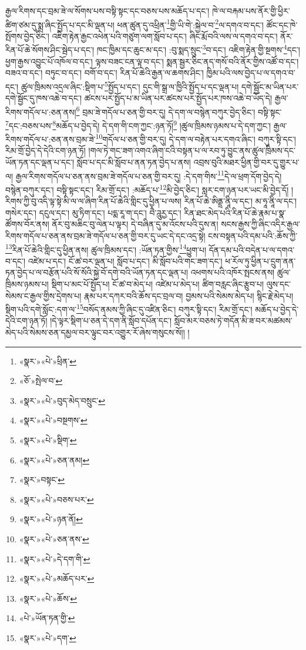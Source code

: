 རྒྱལ་རིགས་དང་བྲམ་ཟེ་ལ་སོགས་པས་བསྟི་སྟང་དང་བཅས་པས་མཆོད་པ་དང་། ཁེ་ལ་བརྐམ་པས་ནོར་གྱི་ཕྱིར་ཚིག་ཙམ་དུ་སྨྲ་ཞིང་སྤྱོད་པ་དང་མི་ལྡན་པ། ཕན་ཚུན་དུ་འཕྲིན་\footnote{«སྣར་»«པེ་»ཕྲིན་}གྱི་ཡི་གེ་:སྐྱེལ་བ་\footnote{«ཅོ་»སྤེལ་བ་}ལ་དགའ་བ་དང་། ཚོང་དང་ཁེ་སྤོགས་བྱེད་ཅིང་། འཇིག་རྟེན་རྒྱང་འཕེན་པའི་གཙུག་ལག་སློབ་པ་དང་། ཞིང་རྨོ་བའི་ལས་ལ་དགའ་བ་དང་། ནོར་རིན་པོ་ཆེ་སོགས་ཤིང་སྦེད་པ་དང་། ཁང་ཁྱིམ་དང་ཆུང་མ་དང་། :བུ་སྨད་སྲུང་\footnote{«སྣར་»«པེ་»བུད་མེད་བསྲུང་}བ་དང་། འཇིག་རྟེན་གྱི་སྔགས་\footnote{«སྣར་»«པེ་»བསྔགས་}དང་། ཕྱག་རྒྱས་འབྱུང་པོ་འཁོལ་བ་དང་། ལྟས་བཟང་ངན་ལྟ་བ་དང་། སྨན་སྦྱར་ཅིང་ནད་གསོ་བའི་ནོར་གྱིས་འཚོ་བ་དང་། བཟའ་བ་དང་། བཏུང་བ་དང་། བགོ་བ་དང་། རིན་པོ་ཆེའི་རྒྱན་ལ་ཆགས་ཤིང་། ཁྱིམ་པའི་ལས་བྱེད་པ་ལ་དགའ་བ་དང་། ཚུལ་ཁྲིམས་འདྲལ་ཞིང་:སྡིག་པ་\footnote{«སྣར་»«པེ་»སྡིག་}སྤྱོད་པ་དང་། དུང་གི་སྒྲ་ལ་ཁྱིའི་སྤྱོད་པ་དང་ལྡན་པ། དགེ་སྦྱོང་མ་ཡིན་པར་དགེ་སྦྱོང་དུ་ཁས་འཆེ་བ་དང་། ཚངས་པར་སྤྱོད་པ་མ་ཡིན་པར་ཚངས་པར་སྤྱོད་པར་ཁས་འཆེ་བ་ཡོད་དེ། རྒྱལ་རིགས་གདོལ་པ་:ཅན་ནས།\footnote{«སྣར་»«པེ་»ཅན་ནམ།} བྲམ་ཟེ་གདོལ་པ་ཅན་གྱི་བར་དུ། དེ་དག་ལ་བསྙེན་བཀུར་བྱེད་ཅིང་། བསྟི་སྟང་\footnote{«སྣར་»བསྟང་}དང་:བཅས་པས་\footnote{«སྣར་»«པེ་»བཅས་པར་}མཆོད་པ་བྱེད་དེ། དེ་དག་གི་ངག་ཀྱང་:ཉན་ཏོ།\footnote{«སྣར་»«པེ་»ཉན་ནོ།} །ཚུལ་ཁྲིམས་ཉམས་པ་དེ་དག་ཀྱང་། རྒྱལ་རིགས་གདོལ་པ་:ཅན་ནས་བྲམ་ཟེ་\footnote{«སྣར་»«པེ་»ཅན་ནས་}གདོལ་པ་ཅན་གྱི་བར་དུ། དེ་དག་ལ་བརྟེན་པར་དགའ་ཞིང་། བཀུར་སྟི་དང་། རིམ་གྲོ་བྱེད་དེ་དེའི་ངག་ཉན་ཏོ། །གལ་ཏེ་གང་ཟག་འགའ་ཞིག་ངའི་བསྟན་པ་ལ་རབ་ཏུ་བྱུང་ནས་ཚུལ་ཁྲིམས་དང་ཡོན་ཏན་དང་ལྡན་པ་དང་། སློབ་པ་དང་མི་སློབ་པ་ནན་ཏན་བྱེད་པ་ནས། འབྲས་བུའི་མཐར་ཕྱིན་གྱི་བར་དུ་གྱུར་པ་ལ། རྒྱལ་རིགས་གདོལ་པ་ཅན་ནས་བྲམ་ཟེ་གདོལ་པ་ཅན་གྱི་བར་དུ། :དེ་དག་གིས་\footnote{«སྣར་»«པེ་»དེ་དག་གི་}དེ་ལ་ཕྲག་དོག་བྱེད་དེ། བསྙེན་བཀུར་དང་། བསྟི་སྟང་དང་། རིམ་གྲོ་དང་། :མཆོད་པ་\footnote{«སྣར་»«པེ་»མཆོད་པར་}མི་བྱེད་ཅིང་། སླར་ངག་ཉན་པར་ཡང་མི་བྱེད་དོ། །རིགས་ཀྱི་བུ་འདི་ལྟ་སྟེ་མི་ལ་ལ་ཞིག་རིན་པོ་ཆེའི་གླིང་དུ་ཕྱིན་པ་ལས། རིན་པོ་ཆེ་ཨིནྡྲ་ནཱི་ལ་དང་། མ་ཧཱ་ནཱི་ལ་དང་། གསེར་དང་། དངུལ་དང་། མུ་ཏིག་དང་། པདྨ་རཱ་ག་དང་། བཻ་ཌཱུརྱ་དང་། རིན་ཐང་མེད་པའི་རིན་པོ་ཆེ་རྣམ་པ་སྣ་ཚོགས་བོར་ནས། ནོར་བུ་མཆིང་བུ་ལེན་པ་ལྟར། དེ་བཞིན་དུ་མ་འོངས་པའི་དུས་ན། སངས་རྒྱས་ཀྱི་ཞིང་འདིར་རྒྱལ་རིགས་གདོལ་པ་ཅན་ནས་བྲམ་ཟེ་གདོལ་པ་ཅན་གྱི་བར་དུ་ཡང་དེ་དང་འདྲ་སྟེ། ངས་བསྟན་པའི་དམ་པའི་:ཆོས་ཀྱི་\footnote{«སྣར་»«པེ་»ཆོས་}རིན་པོ་ཆེའི་གླིང་དུ་ཕྱིན་ནས། ཚུལ་ཁྲིམས་དང་། :ཡོན་ཏན་གྱིས་\footnote{«པེ་»ཡོན་ཏན་གྱི་}ཕྱུག་པ། དོན་དམ་པའི་བདེན་པ་ལ་དགའ་བ་དང་། འཛེམ་པ་དང་། ངོ་ཚ་བར་ལྡན་པ། སློབ་པ་དང་། མི་སློབ་པའི་གང་ཟག་དང་། ཕ་རོལ་ཏུ་ཕྱིན་པ་དྲུག་ནན་ཏན་བྱེད་པ་ལ་བརྩོན་པའི་སོ་སོའི་སྐྱེ་བོ་དགེ་བའི་ཡོན་ཏན་དང་ལྡན་པ། འཕགས་པའི་འཁོར་སྤངས་ནས། ཚུལ་ཁྲིམས་ཉམས་པ། སྡིག་པ་མང་པོ་སྤྱོད་པ། ངོ་ཚ་བ་མེད་པ། འཛེམ་པ་མེད་པ། ཚིག་བརླང་ཞིང་རྩུབ་པ། ལུས་དང་སེམས་ང་རྒྱལ་གྱིས་དྲེགས་པ། རྣམ་པར་དཀར་བའི་ཆོས་དང་བྲལ་བ། བྱམས་པའི་སེམས་མེད་པ། སྙིང་རྗེ་མེད་པ། སྡིག་པའི་དགེ་སློང་:དག་ལ་\footnote{«སྣར་»«པེ་»དག་}བསོད་ནམས་ཀྱི་ཞིང་དུ་འཛིན་ཅིང་། བཀུར་སྟི་དང་། རིམ་གྲོ་དང་། མཆོད་པ་བྱེད་དེ་དེའི་ངག་ཉན་ཏོ། །དེ་ལྟར་སྡིག་པ་ཅན་དེ་དག་ནི་སློབ་དཔོན་དང་། སློབ་མར་བཅས་ཏེ་གདོན་མི་ཟ་བར་མཚམས་མེད་པའི་སེམས་ཅན་དམྱལ་བར་ལྟུང་བར་འགྱུར་རོ་ཞེས་གསུངས་སོ།། །
